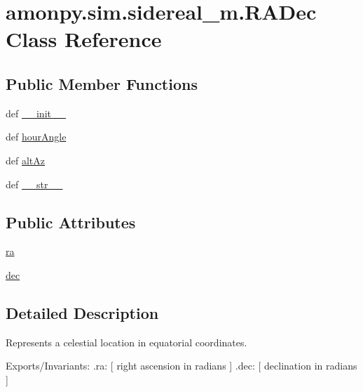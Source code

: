 \hypertarget{classamonpy_1_1sim_1_1sidereal__m_1_1_r_a_dec}{\section{amonpy.\-sim.\-sidereal\-\_\-m.\-R\-A\-Dec Class Reference}
\label{classamonpy_1_1sim_1_1sidereal__m_1_1_r_a_dec}
}
\subsection*{Public Member Functions}
\begin{DoxyCompactItemize}
\item 
def \hyperlink{classamonpy_1_1sim_1_1sidereal__m_1_1_r_a_dec_ab784fce41a417eb9e9b37a113030c174}{\-\_\-\-\_\-init\-\_\-\-\_\-}
\item 
def \hyperlink{classamonpy_1_1sim_1_1sidereal__m_1_1_r_a_dec_ae1a8ea85442985312ff0405bc80fc94f}{hour\-Angle}
\item 
def \hyperlink{classamonpy_1_1sim_1_1sidereal__m_1_1_r_a_dec_a25106370c552fcbc617837e1fcc19369}{alt\-Az}
\item 
def \hyperlink{classamonpy_1_1sim_1_1sidereal__m_1_1_r_a_dec_a9c2bda99c2b71ba9202d5cf3f4638b47}{\-\_\-\-\_\-str\-\_\-\-\_\-}
\end{DoxyCompactItemize}
\subsection*{Public Attributes}
\begin{DoxyCompactItemize}
\item 
\hyperlink{classamonpy_1_1sim_1_1sidereal__m_1_1_r_a_dec_a590d55ece9cf58841cc6add5dd398571}{ra}
\item 
\hyperlink{classamonpy_1_1sim_1_1sidereal__m_1_1_r_a_dec_aa52d7f5a2e2bf4d4ba5b48c3a6f727f3}{dec}
\end{DoxyCompactItemize}


\subsection{Detailed Description}
\begin{DoxyVerb}Represents a celestial location in equatorial coordinates.

  Exports/Invariants:
    .ra:      [ right ascension in radians ]
    .dec:     [ declination in radians ]
\end{DoxyVerb}
 


